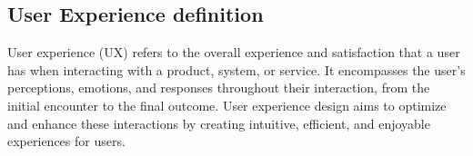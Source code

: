 \subsection{User Experience definition}
User experience (UX) refers to the overall experience and satisfaction that a user has when interacting with a product, system, or service. 
It encompasses the user's perceptions, emotions, and responses throughout their interaction, from the initial encounter to the final outcome. 
User experience design aims to optimize and enhance these interactions by creating intuitive, efficient, and enjoyable experiences for users.